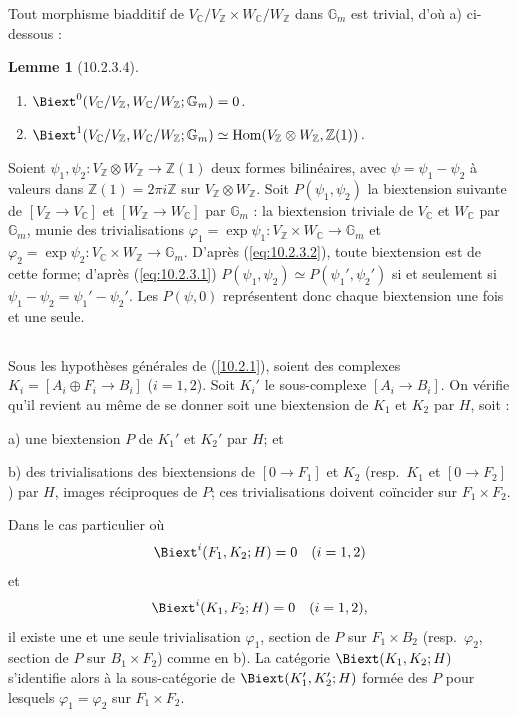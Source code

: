 \documentclass[12pt,a4paper]{amsart}
\theoremstyle{plain}
\newtheorem{lemme}{Lemme}[section]
\theoremstyle{definition}
\theoremstyle{remark}
\DeclareMathOperator{\Hom}{Hom}
\numberwithin{equation}{section}
\begin{document}
Tout morphisme biadditif de $V_\mathbb{C}/V_\mathbb{Z}\times W_\mathbb{C}/W_\mathbb{Z}$ dans $\mathbb{G}_m$ est trivial, d'où a) ci-dessous :

\begin{lemme}[10.2.3.4]\label{lemme:10.2.3.4}
\begin{enumerate}
\item[a)] $\Biext^0(V_\mathbb{C}/V_\mathbb{Z},W_\mathbb{C}/W_\mathbb{Z};\mathbb{G}_m)=0$.
\item[b)] $\Biext^1(V_\mathbb{C}/V_\mathbb{Z},W_\mathbb{C}/W_\mathbb{Z};\mathbb{G}_m)\simeq\Hom(V_\mathbb{Z}\otimes W_\mathbb{Z},\mathbb{Z}(1))$.
\end{enumerate}
\end{lemme}

Soient $\psi_1,\psi_2:V_\mathbb{Z}\otimes W_\mathbb{Z}\to\mathbb{Z}(1)$ deux formes bilinéaires, avec $\psi=\psi_1-\psi_2$ à valeurs dans $\mathbb{Z}(1)=2\pi i\mathbb{Z}$ sur $V_\mathbb{Z}\otimes W_\mathbb{Z}$. Soit $P(\psi_1,\psi_2)$ la biextension suivante de $[V_\mathbb{Z}\to V_\mathbb{C}]$ et $[W_\mathbb{Z}\to W_\mathbb{C}]$ par $\mathbb{G}_m$ : la biextension triviale de $V_\mathbb{C}$ et $W_\mathbb{C}$ par $\mathbb{G}_m$, munie des trivialisations $\varphi_1=\exp\psi_1:V_\mathbb{Z}\times W_\mathbb{C}\to\mathbb{G}_m$ et $\varphi_2=\exp\psi_2:V_\mathbb{C}\times W_\mathbb{Z}\to\mathbb{G}_m$. D'après (\ref{eq:10.2.3.2}), toute biextension est de cette forme; d'après (\ref{eq:10.2.3.1}) $P(\psi_1,\psi_2)\simeq P(\psi_1',\psi_2')$ si et seulement si $\psi_1-\psi_2=\psi_1'-\psi_2'$. Les $P(\psi,0)$ représentent donc chaque biextension une fois et une seule.

\subsection{}\label{10.2.3.5}
Sous les hypothèses générales de (\ref{10.2.1}), soient des complexes $K_i=[A_i\oplus F_i\to B_i]$ ($i=1,2$). Soit $K_i'$ le sous-complexe $[A_i\to B_i]$. On vérifie qu'il revient au même de se donner soit une biextension de $K_1$ et $K_2$ par $H$, soit :

a) une biextension $P$ de $K_1'$ et $K_2'$ par $H$; et

b) des trivialisations des biextensions de $[0\to F_1]$ et $K_2$ (resp.~$K_1$ et $[0\to F_2]$) par $H$, images réciproques de $P$; ces trivialisations doivent coïncider sur $F_1\times F_2$.

Dans le cas particulier où
\[
\Biext^i(F_1,K_2;H)=0 \quad (i=1,2)
\]
et
\[
\Biext^i(K_1,F_2;H)=0 \quad (i=1,2),
\]
il existe une et une seule trivialisation $\varphi_1$, section de $P$ sur $F_1\times B_2$ (resp.~$\varphi_2$, section de $P$ sur $B_1\times F_2$) comme en b). La catégorie $\Biext(K_1,K_2;H)$ s'identifie alors à la sous-catégorie de $\Biext(K_1',K_2';H)$ formée des $P$ pour lesquels $\varphi_1=\varphi_2$ sur $F_1\times F_2$.
\end{document}
